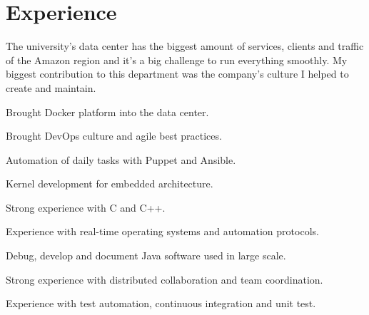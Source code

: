 \documentclass[]{willianpaixao-resume}
\begin{document}
\hfill
\begin{minipage}[t]{0.64\textwidth}

\section{Experience}
\sectionsep
The university's data center has the biggest amount of services, clients and
traffic of the Amazon region and it's a big challenge to run everything smoothly.
My biggest contribution to this department was the company's culture I helped to
create and maintain.
\sectionsep
\begin{tightemize}
\item Brought Docker platform into the data center.
\item Brought DevOps culture and agile best practices.
\item Automation of daily tasks with Puppet and Ansible.
\end{tightemize}
\sectionsep

\begin{tightemize}
\item Kernel development for embedded architecture.
\item Strong experience with C and C++.
\item Experience with real-time operating systems and automation protocols.
\end{tightemize}
\sectionsep

\begin{tightemize}
\item Debug, develop and document Java software used in large scale.
\item Strong experience with distributed collaboration and team coordination.
\item Experience with test automation, continuous integration and unit test.
\end{tightemize}
\sectionsep


\end{minipage}
\end{document}
